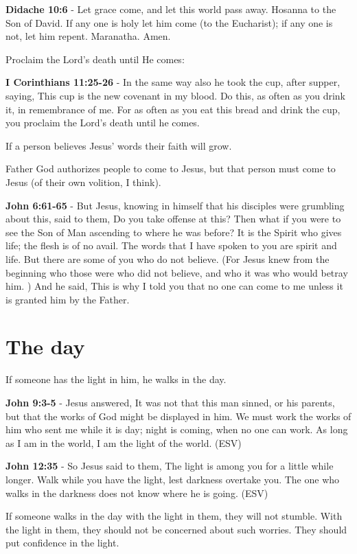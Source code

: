 \documentclass[11pt]{article}
\begin{document}
\textbf{Didache 10:6} - Let grace come, and let this world pass away. Hosanna to the Son of David. If any one is holy let him come (to the Eucharist); if any one is not, let him repent. Maranatha. Amen.

Proclaim the Lord's death until He comes:

\textbf{I Corinthians 11:25-26} - In the same way also he took the cup, after supper, saying, This cup is the new covenant in my blood. Do this, as often as you drink it, in remembrance of me. For as often as you eat this bread and drink the cup, you proclaim the Lord's death until he comes.

If a person believes Jesus' words their faith will grow.

Father God authorizes people to come to Jesus, but that person must come to Jesus (of their own volition, I think).

\textbf{John 6:61-65} - But Jesus, knowing in himself that his disciples were grumbling about this, said to them, Do you take offense at this?  Then what if you were to see the Son of Man ascending to where he was before?  It is the Spirit who gives life; the flesh is of no avail. The words that I have spoken to you are spirit and life.  But there are some of you who do not believe. (For Jesus knew from the beginning who those were who did not believe, and who it was who would betray him. ) And he said, This is why I told you that no one can come to me unless it is granted him by the Father.

\section{The day}
\label{sec:orgf290ea4}
If someone has the light in him, he walks in the day.

\textbf{John 9:3-5} - Jesus answered, It was not that this man sinned, or his parents, but that the works of God might be displayed in him. We must work the works of him who sent me while it is day; night is coming, when no one can work. As long as I am in the world, I am the light of the world. (ESV)

\textbf{John 12:35} - So Jesus said to them, The light is among you for a little while longer.  Walk while you have the light, lest darkness overtake you.  The one who walks in the darkness does not know where he is going.  (ESV)

If someone walks in the day with the light in them, they will not stumble.
With the light in them, they should not be concerned about such worries.
They should put confidence in the light.
\end{document}

